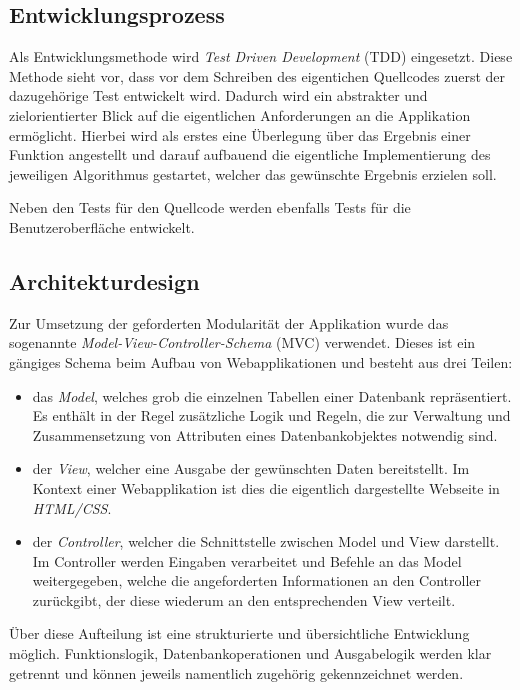\subsection{Entwicklungsprozess}
\label{sec:Entwicklungsprozess}
Als Entwicklungsmethode wird \textit{Test Driven Development} (\acs{TDD}) eingesetzt. Diese Methode
sieht vor, dass vor dem Schreiben des eigentichen Quellcodes zuerst der
dazugehörige Test entwickelt wird. Dadurch wird ein abstrakter und
zielorientierter Blick auf die eigentlichen Anforderungen an die Applikation ermöglicht.
Hierbei wird als erstes eine Überlegung über das Ergebnis einer Funktion angestellt und darauf
aufbauend die eigentliche Implementierung des jeweiligen Algorithmus gestartet, welcher das gewünschte
Ergebnis erzielen soll.

Neben den Tests für den Quellcode werden ebenfalls Tests für die Benutzeroberfläche entwickelt.

\subsection{Architekturdesign}
\label{sec:Architekturdesign}
Zur Umsetzung der geforderten Modularität der Applikation wurde das sogenannte
\textit{Model-View-Controller-Schema} (\acs{MVC}) verwendet. Dieses ist ein gängiges Schema beim Aufbau von
Webapplikationen und besteht aus drei Teilen:
\begin{itemize}
	\item das \textit{Model}, welches grob die einzelnen Tabellen einer Datenbank repräsentiert. Es enthält in
	der Regel zusätzliche Logik und Regeln, die zur Verwaltung und Zusammensetzung von Attributen
	eines Datenbankobjektes notwendig sind.
	\item der \textit{View}, welcher eine Ausgabe der gewünschten Daten bereitstellt. Im Kontext einer
	Webapplikation ist dies die eigentlich dargestellte Webseite in \textit{HTML/CSS}.
	\item der \textit{Controller}, welcher die Schnittstelle zwischen Model und View darstellt.
	Im Controller werden Eingaben verarbeitet und Befehle an das Model weitergegeben, welche
	die angeforderten Informationen an den Controller zurückgibt, der diese wiederum an den
	entsprechenden View verteilt.
\end{itemize}
Über diese Aufteilung ist eine strukturierte und übersichtliche Entwicklung möglich. Funktionslogik,
Datenbankoperationen und Ausgabelogik werden klar getrennt und können jeweils namentlich zugehörig
gekennzeichnet werden.

